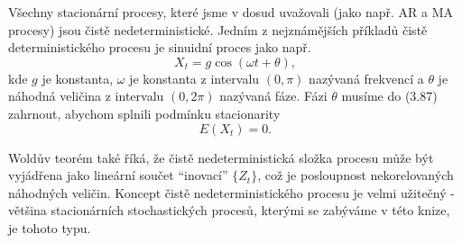 Všechny stacionární procesy, které jsme v dosud uvažovali (jako např. AR a MA procesy) jsou čistě nedeterministické. Jedním z nejznámějších příkladů čistě deterministického procesu je sinuidní proces jako např.
\begin{equation}
X_t = g \cos(\omega t + \theta),
\end{equation}
kde $g$ je konstanta, $\omega$ je konstanta z intervalu $(0, \pi)$ nazývaná frekvencí a $\theta$ je náhodná veličina z intervalu $(0, 2 \pi)$ nazývaná fáze. Fázi $\theta$ musíme do (3.87) zahrnout, abychom splnili podmínku stacionarity
\begin{equation}
E(X_t) = 0.
\end{equation}

Woldův teorém také říká, že čistě nedeterministická složka procesu může být vyjádřena jako lineární součet ``inovací'' $\{Z_t\}$, což je posloupnost nekorelovaných náhodných veličin. Koncept čistě nedeterministického procesu je velmi užitečný - většina stacionárních stochastických procesů, kterými se zabýváme v této knize, je tohoto typu.